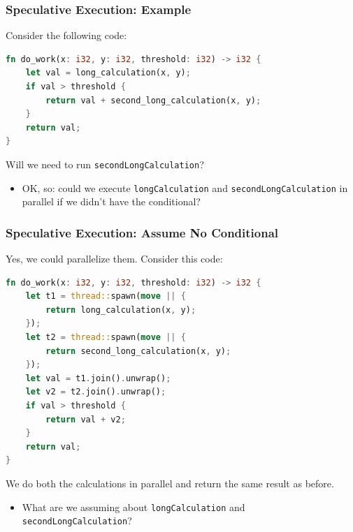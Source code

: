 \begin{frame}[fragile]
  \frametitle{Speculative Execution: Example}

  
Consider the following code:
  
\begin{lstlisting}[language=Rust]
fn do_work(x: i32, y: i32, threshold: i32) -> i32 {
    let val = long_calculation(x, y);
    if val > threshold {
        return val + second_long_calculation(x, y);
    }
    return val;
}
\end{lstlisting}

  Will we need to run {\tt secondLongCalculation}?
  \vfill  
  \begin{itemize}
    \item<2> OK, so: could we execute {\tt longCalculation} and {\tt secondLongCalculation}
      in parallel if we didn't have the conditional?
  \end{itemize}
  
\end{frame}

\begin{frame}[fragile]
  \frametitle{Speculative Execution: Assume No Conditional}

  
  Yes, we could parallelize them. Consider this code:
    
\begin{lstlisting}[language=Rust]
fn do_work(x: i32, y: i32, threshold: i32) -> i32 {
    let t1 = thread::spawn(move || {
        return long_calculation(x, y);
    });
    let t2 = thread::spawn(move || {
        return second_long_calculation(x, y);
    });
    let val = t1.join().unwrap();
    let v2 = t2.join().unwrap();
    if val > threshold {
        return val + v2;
    }
    return val;
}
\end{lstlisting}

  We do both the calculations in parallel and return the same result as before.
  
    \begin{itemize}
    \item What are we assuming about {\tt longCalculation} and
{\tt secondLongCalculation}?
  \end{itemize}


\end{frame}


